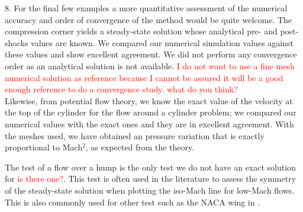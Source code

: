 \documentclass{article}
\newcommand{\tcr}[1]{\textcolor{red}{#1}}
\begin{document}
{
\color{blue}
8. For the final few examples a more quantitative assessment of the
numerical accuracy and order of convergence of the method would be
quite welcome.
}
The compression corner yields a steady-state solution whose analytical pre- and post-shocks values are known. 
We compared our numerical simulation values against these values and show excellent agreement. 
We did not perform any convergence order as an analytical solution is not available. 
\tcr{I do not want to use a fine mesh numerical solution as reference because I cannot be assured it will be a good
enough reference to do a convergence study. what do you think?\\}
Likewise, from potential flow theory, we know the exact value of the velocity at the top of the cylinder for the flow around a 
cylinder problem; we compared our numerical values with the exact ones and they are in excellent agreement.
With the meshes used, we have obtained an pressure variation that is exactly proportional to Mach$^2$, as expected from the theory.

The test of a flow over a hump is the only test we do not have an exact solution for \tcr{is there one?}.
This test is often used in the literature to assess the symmetry of the steady-state solution when plotting the iso-Mach line 
for low-Mach flows. This is also commonly used for other test such as the NACA wing in \cite{LowMach1}.
\bigskip


\end{document}
